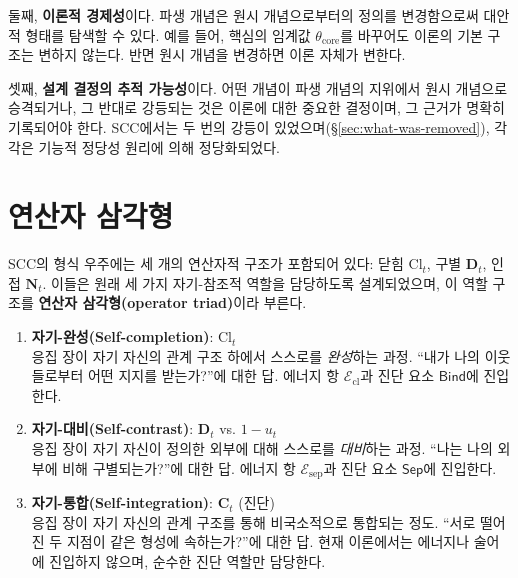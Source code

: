 둘째, \textbf{이론적 경제성}이다. 파생 개념은 원시 개념으로부터의 정의를 변경함으로써 대안적 형태를 탐색할 수 있다. 예를 들어, 핵심의 임계값 $\theta_{\mathrm{core}}$를 바꾸어도 이론의 기본 구조는 변하지 않는다. 반면 원시 개념을 변경하면 이론 자체가 변한다.

셋째, \textbf{설계 결정의 추적 가능성}이다. 어떤 개념이 파생 개념의 지위에서 원시 개념으로 승격되거나, 그 반대로 강등되는 것은 이론에 대한 중요한 결정이며, 그 근거가 명확히 기록되어야 한다. SCC에서는 두 번의 강등이 있었으며(\S\ref{sec:what-was-removed}), 각각은 기능적 정당성 원리에 의해 정당화되었다.


\section{연산자 삼각형}
\label{sec:operator-triad}

SCC의 형식 우주에는 세 개의 연산자적 구조가 포함되어 있다: 닫힘 $\mathrm{Cl}_t$, 구별 $\mathbf{D}_t$, 인접 $\mathbf{N}_t$. 이들은 원래 세 가지 자기-참조적 역할을 담당하도록 설계되었으며, 이 역할 구조를 \textbf{연산자 삼각형(operator triad)}이라 부른다.

\begin{enumerate}
    \item \textbf{자기-완성(Self-completion)}: $\mathrm{Cl}_t$\\
    응집 장이 자기 자신의 관계 구조 하에서 스스로를 \emph{완성}하는 과정. ``내가 나의 이웃들로부터 어떤 지지를 받는가?''에 대한 답. 에너지 항 $\mathcal{E}_{\mathrm{cl}}$과 진단 요소 $\mathsf{Bind}$에 진입한다.

    \item \textbf{자기-대비(Self-contrast)}: $\mathbf{D}_t$ vs. $1-u_t$\\
    응집 장이 자기 자신이 정의한 외부에 대해 스스로를 \emph{대비}하는 과정. ``나는 나의 외부에 비해 구별되는가?''에 대한 답. 에너지 항 $\mathcal{E}_{\mathrm{sep}}$과 진단 요소 $\mathsf{Sep}$에 진입한다.

    \item \textbf{자기-통합(Self-integration)}: $\mathbf{C}_t$ (진단)\\
    응집 장이 자기 자신의 관계 구조를 통해 비국소적으로 통합되는 정도. ``서로 떨어진 두 지점이 같은 형성에 속하는가?''에 대한 답. 현재 이론에서는 에너지나 술어에 진입하지 않으며, 순수한 진단 역할만 담당한다.
\end{enumerate}

